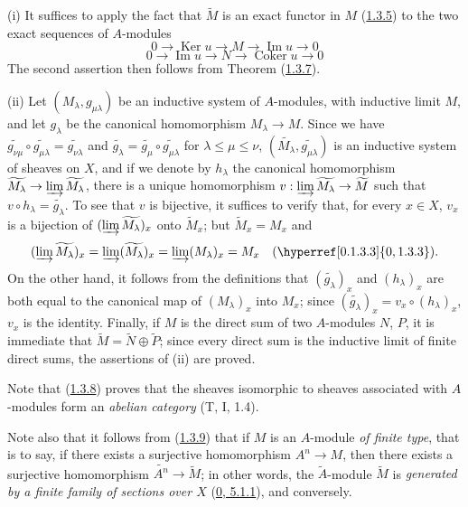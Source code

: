 (i) It suffices to apply the fact that $\widetilde{M}$ is an exact functor in
$M$ (\hyperref[I.1.3.5]{1.3.5}) to the two exact sequences of $A$-modules
\[
  0\to\operatorname{Ker}u\to M\to\operatorname{Im}u\to0
\]
\[
  0\to\operatorname{Im}u\to N\to\operatorname{Coker}u\to0
\]
The second assertion then follows from Theorem
(\hyperref[I.1.3.7]{1.3.7}).

(ii) Let $(M_\lambda,g_{\mu\lambda})$ be an inductive system of $A$-modules,
with inductive limit $M$, and let $g_\lambda$ be the canonical homomorphism
$M_\lambda\to M$. Since we have
$\widetilde{g_{\nu\mu}}\circ\widetilde{g_{\mu\lambda}}
=\widetilde{g_{\nu\lambda}}$ and
$\widetilde{g_\lambda}=\widetilde{g_\mu}\circ
\widetilde{g_{\mu\lambda}}$ for $\lambda\leq\mu\leq\nu$,
$(\widetilde{M_\lambda},\widetilde{g_{\mu\lambda}})$ is an inductive
system of sheaves on $X$, and if we denote by $h_\lambda$
the canonical homomorphism
$\widetilde{M_\lambda}\to\varinjlim\widetilde{M_\lambda}$, there is a
unique homomorphism
$v:\varinjlim\widetilde{M_\lambda}\to\widetilde{M}$ such that
$v\circ h_\lambda=\widetilde{g_\lambda}$. To see that $v$ is bijective, it
suffices to verify that, for every $x\in X$, $v_x$ is a bijection of
$(\varinjlim\widetilde{M_\lambda})_x$ onto $\widetilde{M}_x$; but
$\widetilde{M}_x=M_x$ and
\[
  (\varinjlim\widetilde{M_\lambda})_x
  =\varinjlim(\widetilde{M_\lambda})_x
  =\varinjlim(M_\lambda)_x=M_x
  \quad(\hyperref[0.1.3.3]{0, 1.3.3}).
\]
On the other hand, it follows from the definitions that
$(\widetilde{g_\lambda})_x$ and $(h_\lambda)_x$ are both equal to the
canonical map of $(M_\lambda)_x$ into $M_x$; since
$(\widetilde{g_\lambda})_x=v_x\circ(h_\lambda)_x$, $v_x$ is the identity.
Finally, if $M$ is the direct sum of two $A$-modules $N$, $P$, it is
immediate that $\widetilde{M}=\widetilde{N}\oplus\widetilde{P}$; since every
direct sum is the inductive limit of finite direct sums, the assertions of
(ii) are proved.

Note that (\hyperref[I.1.3.8]{1.3.8}) proves that the sheaves
isomorphic to sheaves associated with $A$-modules form an
\emph{abelian category} (T, I, 1.4).

Note also that it follows from (\hyperref[I.1.3.9]{1.3.9}) that if $M$
is an $A$-module \emph{of finite type}, that is to say, if there exists a
surjective homomorphism $A^n\to M$, then there exists a surjective
homomorphism $\widetilde{A^n}\to\widetilde{M}$; in other words, the
$\widetilde{A}$-module $\widetilde{M}$ is \emph{generated by a finite family
of sections over $X$} (\hyperref[0.5.1.1]{0, 5.1.1}), and conversely.

